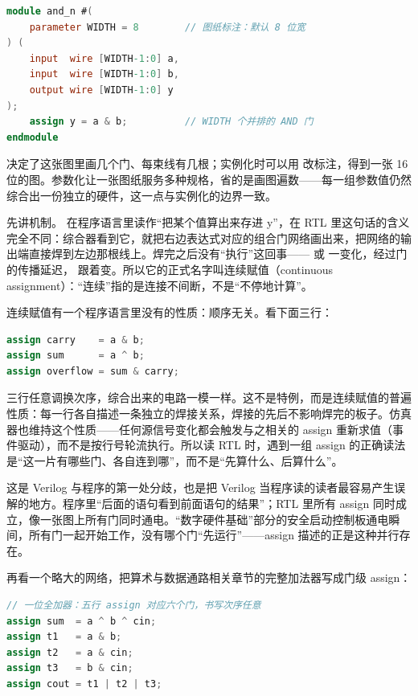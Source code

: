 \begin{lstlisting}[language=Verilog]
module and_n #(
    parameter WIDTH = 8        // 图纸标注：默认 8 位宽
) (
    input  wire [WIDTH-1:0] a,
    input  wire [WIDTH-1:0] b,
    output wire [WIDTH-1:0] y
);
    assign y = a & b;          // WIDTH 个并排的 AND 门
endmodule
\end{lstlisting}

 决定了这张图里画几个门、每束线有几根；实例化时可以用  改标注，得到一张 16 位的图。参数化让一张图纸服务多种规格，省的是画图遍数——每一组参数值仍然综合出一份独立的硬件，这一点与实例化的边界一致。

先讲机制。 在程序语言里读作“把某个值算出来存进 y”，在 RTL 里这句话的含义完全不同：综合器看到它，就把右边表达式对应的组合门网络画出来，把网络的输出端直接焊到左边那根线上。焊完之后没有“执行”这回事—— 或  一变化，经过门的传播延迟， 跟着变。所以它的正式名字叫连续赋值（continuous assignment）：“连续”指的是连接不间断，不是“不停地计算”。

连续赋值有一个程序语言里没有的性质：顺序无关。看下面三行：

\begin{lstlisting}[language=Verilog]
assign carry    = a & b;
assign sum      = a ^ b;
assign overflow = sum & carry;
\end{lstlisting}

三行任意调换次序，综合出来的电路一模一样。这不是特例，而是连续赋值的普遍性质：每一行各自描述一条独立的焊接关系，焊接的先后不影响焊完的板子。仿真器也维持这个性质——任何源信号变化都会触发与之相关的 assign 重新求值（事件驱动），而不是按行号轮流执行。所以读 RTL 时，遇到一组 assign 的正确读法是“这一片有哪些门、各自连到哪”，而不是“先算什么、后算什么”。

这是 Verilog 与程序的第一处分歧，也是把 Verilog 当程序读的读者最容易产生误解的地方。程序里“后面的语句看到前面语句的结果”；RTL 里所有 assign 同时成立，像一张图上所有门同时通电。“数字硬件基础”部分的安全启动控制板通电瞬间，所有门一起开始工作，没有哪个门“先运行”——assign 描述的正是这种并行存在。

再看一个略大的网络，把算术与数据通路相关章节的完整加法器写成门级 assign：

\begin{lstlisting}[language=Verilog]
// 一位全加器：五行 assign 对应六个门，书写次序任意
assign sum  = a ^ b ^ cin;
assign t1   = a & b;
assign t2   = a & cin;
assign t3   = b & cin;
assign cout = t1 | t2 | t3;
\end{lstlisting}

